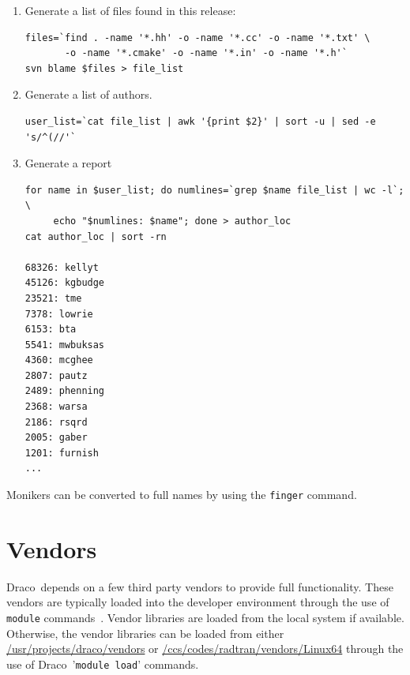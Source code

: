 \documentclass[note]{newmemo}
\newcommand{\draco}{{\normalfont\small\sffamily Draco}}
\begin{document}
\begin{enumerate}
\item Generate a list of files found in this release:
\begin{lstlisting}[basicstyle=\footnotesize, xleftmargin=0.75in, 
  xrightmargin=0.75in]
files=`find . -name '*.hh' -o -name '*.cc' -o -name '*.txt' \
       -o -name '*.cmake' -o -name '*.in' -o -name '*.h'`
svn blame $files > file_list
\end{lstlisting}
\item Generate a list of authors.
\begin{lstlisting}[basicstyle=\footnotesize, xleftmargin=0.75in, 
  xrightmargin=0.75in]
user_list=`cat file_list | awk '{print $2}' | sort -u | sed -e 's/^(//'`
\end{lstlisting}
\item Generate a report
\begin{lstlisting}[basicstyle=\footnotesize, xleftmargin=0.75in, 
  xrightmargin=0.75in]
for name in $user_list; do numlines=`grep $name file_list | wc -l`; \
     echo "$numlines: $name"; done > author_loc
cat author_loc | sort -rn

68326: kellyt
45126: kgbudge
23521: tme
7378: lowrie
6153: bta
5541: mwbuksas
4360: mcghee
2807: pautz
2489: phenning
2368: warsa
2186: rsqrd
2005: gaber
1201: furnish
...
\end{lstlisting}
\end{enumerate}

Monikers can be converted to full names by using the \texttt{finger}
command. 


\section{Vendors}
\label{sec:vendors}

\draco\ depends on a few third party vendors to provide full
functionality.  These vendors are typically loaded into the developer
environment through the use of \texttt{module}
commands~\cite{modulecmd}.  Vendor libraries are loaded from the local
system if available.  Otherwise, the vendor libraries can be loaded
from either \url{/usr/projects/draco/vendors} or
\url{/ccs/codes/radtran/vendors/Linux64} through the use of
\draco\ '\texttt{module load}' commands.
\end{document}
